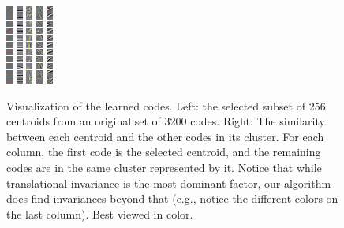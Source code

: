 \begin{figure}[t]
        \includegraphics[height=\codeheight\textwidth]{figs/sizematters/centroids/205-neighbors.png}
        \includegraphics[height=\codeheight\textwidth]{figs/sizematters/centroids/212-neighbors.png}
        \includegraphics[height=\codeheight\textwidth]{figs/sizematters/centroids/216-neighbors.png}
        \includegraphics[height=\codeheight\textwidth]{figs/sizematters/centroids/222-neighbors.png}
        \includegraphics[height=\codeheight\textwidth]{figs/sizematters/centroids/229-neighbors.png}
    \caption{Visualization of the learned codes. Left: the selected subset of 256 centroids from an original set of 3200 codes. Right: The similarity between each centroid and the other codes in its cluster. For each column, the first code is the selected centroid, and the remaining codes are in the same cluster represented by it. Notice that while translational invariance is the most dominant factor, our algorithm does find invariances beyond that (e.g., notice the different colors on the last column). Best viewed in color.}\label{fig:centroidcodes}
\end{figure}


